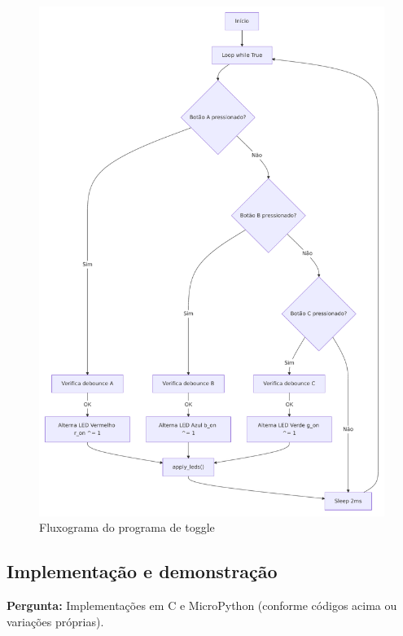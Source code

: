 \documentclass{article}
\begin{document}
\begin{figure}[ht!]
    \centering
    \includegraphics[width=\linewidth]{diagrama.pdf}
    \caption{Fluxograma do programa de toggle}
    \label{fig:togle}
\end{figure}

\subsection{Implementação e demonstração}
\noindent
\textbf{Pergunta:} Implementações em C e MicroPython (conforme códigos acima ou variações próprias). \\
\end{document}

